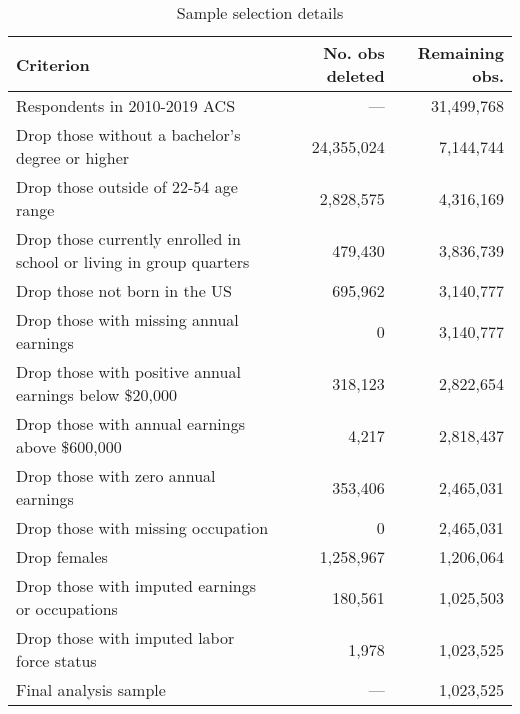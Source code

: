 \begin{table}[ht]
\caption{Sample selection details}
\label{tab:sampleselection}
\centering
\begin{threeparttable}
\begin{tabular}{lrr}
\toprule
Criterion                                                 & No. obs deleted  & Remaining obs.  \\
\midrule
Respondents in 2010-2019 ACS                              &      ---         & 31,499,768 \\ 
Drop those without a bachelor's degree or higher          & 24,355,024 & 7,144,744 \\ 
Drop those outside of 22-54 age range                     & 2,828,575 & 4,316,169 \\ 
Drop those currently enrolled in school or living in group quarters & 479,430 & 3,836,739 \\ 
Drop those not born in the US                             & 695,962 & 3,140,777 \\ 
Drop those with missing annual earnings                   & 0 & 3,140,777 \\ 
Drop those with positive annual earnings below \$20,000   & 318,123 & 2,822,654 \\ 
Drop those with annual earnings above \$600,000           & 4,217 & 2,818,437 \\ 
Drop those with zero annual earnings                      & 353,406 & 2,465,031 \\ 
Drop those with missing occupation                        & 0 & 2,465,031 \\ 
Drop females                                              & 1,258,967 & 1,206,064 \\ 
Drop those with imputed earnings or occupations           & 180,561 & 1,025,503 \\ 
Drop those with imputed labor force status                & 1,978 & 1,023,525 \\ 
\midrule
Final analysis sample                                     &      ---         &     1,023,525 \\ 
\bottomrule
\end{tabular}
\end{threeparttable}
\end{table}
